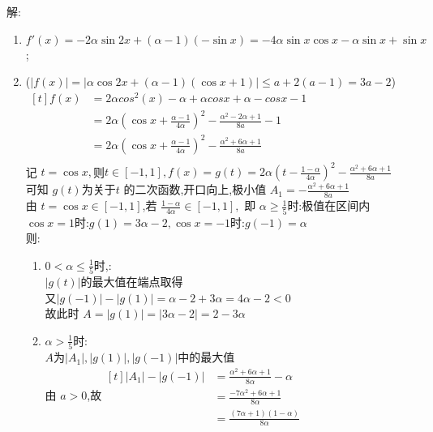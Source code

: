 \documentclass[class=ctexart,crop=false]{standalone}
\begin{document}
解:
\begin{enumerate}[label=(\Roman*)]
    \item $f'(x)=-2\alpha \sin 2x+(\alpha-1)(-\sin x)=-4\alpha\sin x\cos x-\alpha\sin x+\sin x$;
    \item 
    ($|f(x)|=|\alpha \cos 2x+(\alpha-1)(\cos x +1)|\leqslant a+2(a-1)=3a-2 $)\\
       $\begin{aligned}[t]
       f(x)&=2\alpha cos^2(x)-\alpha+\alpha cos x+\alpha -cos x -1\\
       &=2\alpha(\cos x +\frac{\alpha-1}{4\alpha})^2-\frac{\alpha^2-2\alpha+1}{8a}-1\\
       &=2\alpha(\cos x +\frac{\alpha-1}{4\alpha})^2-\frac{\alpha^2+6\alpha+1}{8a}\\
       \end{aligned}$\\
       记 $t=\cos x,$则$t \in [-1,1],f(x)=g(t)=2\alpha(t-\frac{1-\alpha}{4\alpha})^2-\frac{\alpha^2+6\alpha+1}{8a}$\\
       可知 $g(t)$为关于$t$ 的二次函数,开口向上,极小值 $A_1=-\frac{\alpha^2+6\alpha+1}{8a}$\\
       由 $t=\cos x\in [-1,1]$,若 $\frac{1-\alpha}{4\alpha}\in [-1,1],$
       即 $\alpha \geqslant \frac{1}{5}$时:极值在区间内\\
       $\cos x=1$时:$g(1)=3\alpha -2,\cos x=-1$时:$g(-1)=\alpha$\\
       则:
    \begin{enumerate}[label=(\roman*)]
        \item $0<\alpha\leqslant \frac{1}{5}$时,:\\
            $|g(t)|$的最大值在端点取得\\
            又$|g(-1)|-|g(1)|=\alpha -2+3\alpha=4\alpha-2<0$\\
            故此时 $A=|g(1)|=|3\alpha-2|=2-3\alpha$
        \item $\alpha>\frac{1}{5} $时:\\
            $A$为$|A_1|,|g(1)|,|g(-1)|$中的最大值\\
            由 $a>0$,故$\begin{aligned}[t]
                |A_1|-|g(-1)|&=\frac{\alpha^2+6\alpha+1}{8\alpha}-\alpha\\
                            &=\frac{-7\alpha^2+6\alpha+1}{8\alpha}\\
                            &=\frac{(7\alpha+1)(1-\alpha)}{8\alpha}
                \end{aligned}$\\ 

\end{enumerate}
\end{enumerate}
\end{document}
